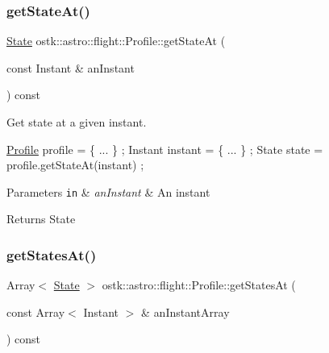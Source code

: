 \subsubsection{\texorpdfstring{get\+State\+At()}{getStateAt()}}
{\footnotesize\ttfamily \hyperlink{classostk_1_1astro_1_1flight_1_1profile_1_1_state}{State} ostk\+::astro\+::flight\+::\+Profile\+::get\+State\+At (\begin{DoxyParamCaption}\item[{const Instant \&}]{an\+Instant }\end{DoxyParamCaption}) const}



Get state at a given instant. 


\begin{DoxyCode}
\hyperlink{classostk_1_1astro_1_1flight_1_1_profile_a80fbc6a3773a6f2790b84c4ddb306d07}{Profile} profile = \{ ... \} ;
Instant instant = \{ ... \} ;
State state = profile.getStateAt(instant) ;
\end{DoxyCode}



\begin{DoxyParams}[1]{Parameters}
\mbox{\tt in}  & {\em an\+Instant} & An instant \\
\hline
\end{DoxyParams}
\begin{DoxyReturn}{Returns}
State 
\end{DoxyReturn}
\mbox{\label{classostk_1_1astro_1_1flight_1_1_profile_af35830c9e26ca7fffcc6e7e3ce86e9b2}} 
\subsubsection{\texorpdfstring{get\+States\+At()}{getStatesAt()}}
{\footnotesize\ttfamily Array$<$ \hyperlink{classostk_1_1astro_1_1flight_1_1profile_1_1_state}{State} $>$ ostk\+::astro\+::flight\+::\+Profile\+::get\+States\+At (\begin{DoxyParamCaption}\item[{const Array$<$ Instant $>$ \&}]{an\+Instant\+Array }\end{DoxyParamCaption}) const}



